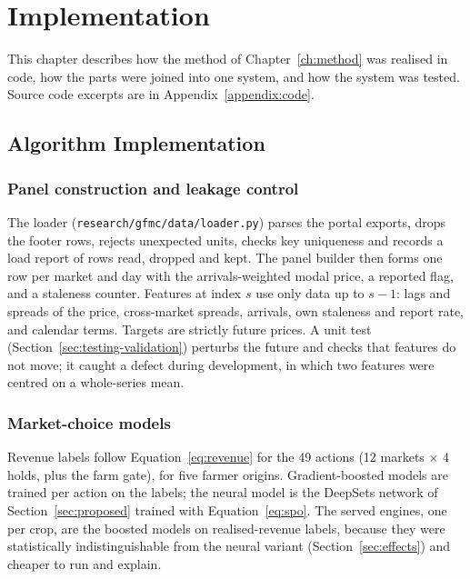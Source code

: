 \chapter{Implementation}
\label{ch:impl}

This chapter describes how the method of Chapter~\ref{ch:method} was realised in code, how the parts were joined into one system, and how the system was tested. Source code excerpts are in Appendix~\ref{appendix:code}.

\section{Algorithm Implementation}
\label{sec:algorithm-implementation}

\subsection{Panel construction and leakage control}

The loader (\texttt{research/gfmc/data/loader.py}) parses the portal exports, drops the footer rows, rejects unexpected units, checks key uniqueness and records a load report of rows read, dropped and kept. The panel builder then forms one row per market and day with the arrivals-weighted modal price, a reported flag, and a staleness counter. Features at index $s$ use only data up to $s-1$: lags and spreads of the price, cross-market spreads, arrivals, own staleness and report rate, and calendar terms. Targets are strictly future prices. A unit test (Section~\ref{sec:testing-validation}) perturbs the future and checks that features do not move; it caught a defect during development, in which two features were centred on a whole-series mean.

\subsection{Market-choice models}

Revenue labels follow Equation~\ref{eq:revenue} for the 49 actions (12 markets $\times$ 4 holds, plus the farm gate), for five farmer origins. Gradient-boosted models are trained per action on the labels; the neural model is the DeepSets network of Section~\ref{sec:proposed} trained with Equation~\ref{eq:spo}. The served engines, one per crop, are the boosted models on realised-revenue labels, because they were statistically indistinguishable from the neural variant (Section~\ref{sec:effects}) and cheaper to run and explain.

